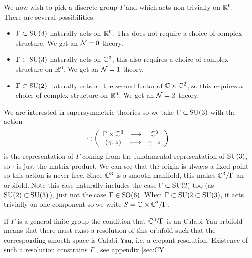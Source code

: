         We now wish to pick a discrete group $\Gamma$ and which acts non-trivially on $\mathbb{R}^6$. There are several possibilities:
        \begin{itemize}
            \item $\Gamma\subset\text{SU}(4)$ naturally acts on $\mathbb{R}^6$. This does not require a choice of complex structure. We get an $\mathcal{N}=0$ theory.
            \item $\Gamma\subset\text{SU}(3)$ naturally acts on $\mathbb{C}^3$, this also requires a choice of complex structure on $\mathbb{R}^6$. We get an $\mathcal{N}=1$ theory.
            \item $\Gamma\subset\text{SU}(2)$ naturally acts on the second factor of $\mathbb{C}\times\mathbb{C}^2$, so this requires a choice of complex structure on $\mathbb{R}^6$. We get an $\mathcal{N}=2$ theory.
        \end{itemize}

        We are interested in supersymmetric theories so we take $\Gamma\subset\text{SU}(3)$ with the action
        \begin{equation}
            \cdot:\left(
            \begin{array}{ccc}
                \Gamma\times\mathbb{C}^3 & \longrightarrow & \mathbb{C}^3 \\
                (\gamma,z) & \longmapsto & \gamma\cdot z
            \end{array}
            \right)
        \end{equation}
        is the representation of $\Gamma$ coming from the fundamental representation of $\text{SU}(3)$, so $\cdot$ is just the matrix product. We can see that the origin is always a fixed point so this action is never free. Since $\mathbb{C}^3$ is a smooth manifold, this makes $\mathbb{C}^3/\Gamma$ an orbifold. Note this case naturally includes the case $\Gamma\subset\text{SU}(2)$ too (as $\text{SU}(2)\subset\text{SU}(3)$), just not the case $\Gamma\in\text{SO}(6)$. When $\Gamma\subset\text{SU}(2\subset\text{SU}(3)$, it acts trivially on one component so we write $S=\mathbb{C}\times\mathbb{C}^2/\Gamma$.

        If $\Gamma$ is a general finite group the condition that $\mathbb{C}^3/\Gamma$ is an Calabi-Yau orbifold means that there must exist a resolution of this orbifold such that the corresponding smooth space is Calabi-Yau, i.e. a crepant resolution. Existence of such a resolution constrains $\Gamma$ \marker, see appendix \ref{sec:CY}.


